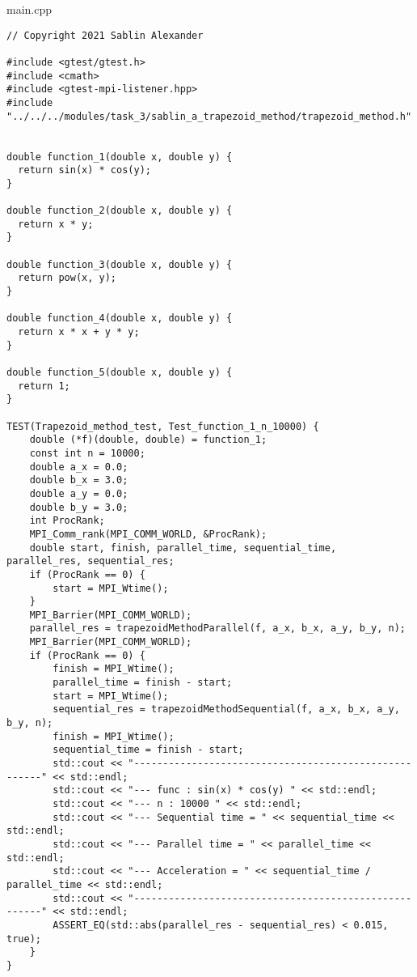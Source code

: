 \documentclass{report}
\begin{document}
main.cpp
\begin{lstlisting}
// Copyright 2021 Sablin Alexander

#include <gtest/gtest.h>
#include <cmath>
#include <gtest-mpi-listener.hpp>
#include "../../../modules/task_3/sablin_a_trapezoid_method/trapezoid_method.h"


double function_1(double x, double y) {
  return sin(x) * cos(y);
}

double function_2(double x, double y) {
  return x * y;
}

double function_3(double x, double y) {
  return pow(x, y);
}

double function_4(double x, double y) {
  return x * x + y * y;
}

double function_5(double x, double y) {
  return 1;
}

TEST(Trapezoid_method_test, Test_function_1_n_10000) {
    double (*f)(double, double) = function_1;
    const int n = 10000;
    double a_x = 0.0;
    double b_x = 3.0;
    double a_y = 0.0;
    double b_y = 3.0;
    int ProcRank;
    MPI_Comm_rank(MPI_COMM_WORLD, &ProcRank);
    double start, finish, parallel_time, sequential_time, parallel_res, sequential_res;
    if (ProcRank == 0) {
        start = MPI_Wtime();
    }
    MPI_Barrier(MPI_COMM_WORLD);
    parallel_res = trapezoidMethodParallel(f, a_x, b_x, a_y, b_y, n);
    MPI_Barrier(MPI_COMM_WORLD);
    if (ProcRank == 0) {
        finish = MPI_Wtime();
        parallel_time = finish - start;
        start = MPI_Wtime();
        sequential_res = trapezoidMethodSequential(f, a_x, b_x, a_y, b_y, n);
        finish = MPI_Wtime();
        sequential_time = finish - start;
        std::cout << "------------------------------------------------------" << std::endl;
        std::cout << "--- func : sin(x) * cos(y) " << std::endl;
        std::cout << "--- n : 10000 " << std::endl;
        std::cout << "--- Sequential time = " << sequential_time << std::endl;
        std::cout << "--- Parallel time = " << parallel_time << std::endl;
        std::cout << "--- Acceleration = " << sequential_time / parallel_time << std::endl;
        std::cout << "------------------------------------------------------" << std::endl;
        ASSERT_EQ(std::abs(parallel_res - sequential_res) < 0.015, true);
    }
}


\end{lstlisting}
\end{document}
